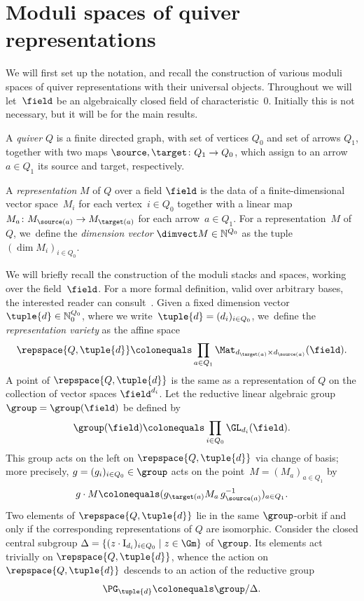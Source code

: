 \section{Moduli spaces of quiver representations}
\label{section:moduli}

We will first set up the notation,
and recall the construction of various moduli spaces of quiver representations
with their universal objects.
Throughout we will let~$\field$ be an algebraically closed field of characteristic~0.
Initially this is not necessary, but it will be for the main results.

A \emph{quiver} $Q$ is a finite directed graph,
with set of vertices $Q_0$ and set of arrows $Q_1$,
together with two maps $\source, \target\colon Q_1 \to Q_0$,
which assign to an arrow $a \in Q_1$ its source and target, respectively.

A \emph{representation} $M$ of $Q$ over a field $\field$
is the data of a finite-dimensional vector space~$M_i$
for each vertex~$i \in Q_0$
together with a linear map~$M_a\colon M_{\source(a)} \to M_{\target(a)}$
for each arrow~$a \in Q_1$.
For a representation~$M$ of~$Q$, we~define the \emph{dimension vector} $\dimvect M \in \smash{\mathbb{N}^{Q_0}}$ as the tuple $(\dim M_i)_{i \in Q_0}$.

We will briefly recall the construction of the moduli stacks and spaces,
working over the field~$\field$.
For a more formal definition,
valid over arbitrary bases,
the interested reader can consult~\cite[\S3]{2210.00033v1}.
Given a fixed dimension vector $\tuple{d} \in \smash{\mathbb{N}_0^{Q_0}}$,
where we write~$\tuple{d}=(d_i)_{i\in Q_0}$, we~define the \emph{representation variety}
as the affine space
\begin{equation}
\label{equation:representation-variety}
\repspace{Q,\tuple{d}}\colonequals \prod_{a \in Q_1} \Mat_{d_{\target(a)} \times d_{\source(a)}}(\field).
\end{equation}
A point of $\repspace{Q,\tuple{d}}$ is the same as a representation of $Q$ on the collection of vector spaces $\field^{d_i}$.
Let the reductive linear algebraic group $\group=\group(\field)$ be defined by
\begin{equation*}
\group(\field)\colonequals \prod_{i \in Q_0} \GL_{d_i}(\field).
\end{equation*}
This group acts on the left on $\repspace{Q,\tuple{d}}$ via change of basis;
more precisely,
$g = (g_i)_{i \in Q_0}\in\group$ acts on the point~$M = (M_a)_{a \in Q_1}$ by
\begin{equation*}
g\cdot M \colonequals (g_{\target(a)}M_a\,g_{\source(a)}^{-1})_{a \in Q_1}.
\end{equation*}
Two elements of $\repspace{Q,\tuple{d}}$ lie in the same $\group$-orbit
if and only if the corresponding representations of $Q$ are isomorphic.
Consider the closed central subgroup \hbox{$\Delta = \{(z\cdot \mathrm{I}_{d_i})_{i \in Q_0} \mid z \in \Gm\}$} of $\group$.
Its elements act trivially on $\repspace{Q,\tuple{d}}$,
whence the action on $\repspace{Q,\tuple{d}}$ descends to an action of the reductive group
\begin{equation*}
\PG_{\tuple{d}} \colonequals \group/\Delta.
\end{equation*}

